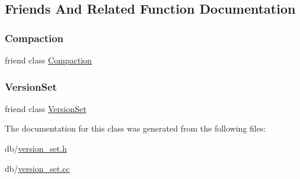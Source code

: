 \subsection{Friends And Related Function Documentation}
\mbox{\label{classleveldb_1_1_version_a9372e882b35d27c78356228e4b758917}} 
\subsubsection{\texorpdfstring{Compaction}{Compaction}}
{\footnotesize\ttfamily friend class \mbox{\hyperlink{classleveldb_1_1_compaction}{Compaction}}\hspace{0.3cm}{\ttfamily [friend]}}

\mbox{\label{classleveldb_1_1_version_a1827cd1b4d6e9e3c378ce37ca3cce635}} 
\subsubsection{\texorpdfstring{VersionSet}{VersionSet}}
{\footnotesize\ttfamily friend class \mbox{\hyperlink{classleveldb_1_1_version_set}{Version\+Set}}\hspace{0.3cm}{\ttfamily [friend]}}



The documentation for this class was generated from the following files\+:\begin{DoxyCompactItemize}
\item 
db/\mbox{\hyperlink{version__set_8h}{version\+\_\+set.\+h}}\item 
db/\mbox{\hyperlink{version__set_8cc}{version\+\_\+set.\+cc}}\end{DoxyCompactItemize}
